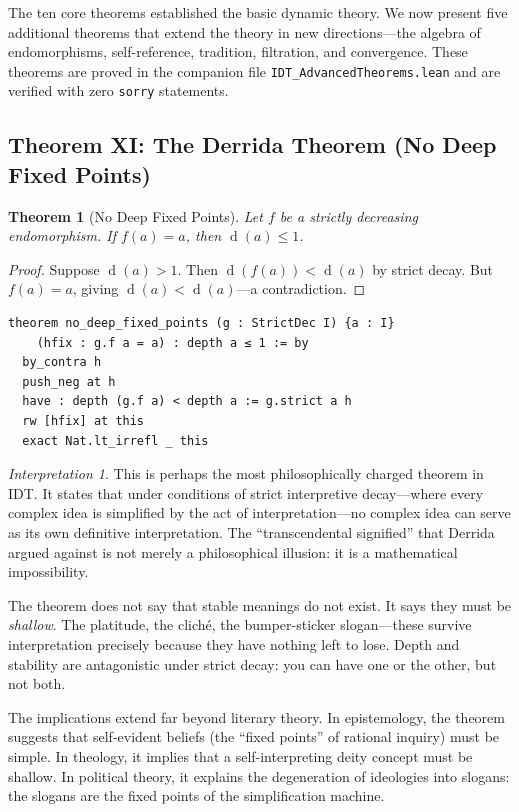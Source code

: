 \documentclass[11pt,openany]{book}
\theoremstyle{definition}
\theoremstyle{plain}
\newtheorem{theorem}[axiom]{Theorem}
\theoremstyle{remark}
\newtheorem{interpretation}[axiom]{Interpretation}
\newcommand{\depth}{\operatorname{d}}       %
\begin{document}
The ten core theorems established the basic dynamic theory. We now present five additional theorems that extend the theory in new directions---the algebra of endomorphisms, self-reference, tradition, filtration, and convergence. These theorems are proved in the companion file \texttt{IDT\_AdvancedTheorems.lean} and are verified with zero \texttt{sorry} statements.

\subsection{Theorem XI: The Derrida Theorem (No Deep Fixed Points)}

\begin{theorem}[No Deep Fixed Points]
\label{thm:key-derrida}
Let $f$ be a strictly decreasing endomorphism. If $f(a) = a$, then $\depth(a) \leq 1$.
\end{theorem}

\begin{proof}
Suppose $\depth(a) > 1$. Then $\depth(f(a)) < \depth(a)$ by strict decay. But $f(a) = a$, giving $\depth(a) < \depth(a)$---a contradiction.
\end{proof}

\begin{lstlisting}[language=Lean4]
theorem no_deep_fixed_points (g : StrictDec I) {a : I}
    (hfix : g.f a = a) : depth a ≤ 1 := by
  by_contra h
  push_neg at h
  have : depth (g.f a) < depth a := g.strict a h
  rw [hfix] at this
  exact Nat.lt_irrefl _ this
\end{lstlisting}

\begin{interpretation}
This is perhaps the most philosophically charged theorem in IDT. It states that under conditions of strict interpretive decay---where every complex idea is simplified by the act of interpretation---no complex idea can serve as its own definitive interpretation. The ``transcendental signified'' that Derrida argued against is not merely a philosophical illusion: it is a mathematical impossibility.

The theorem does not say that stable meanings do not exist. It says they must be \emph{shallow}. The platitude, the cliché, the bumper-sticker slogan---these survive interpretation precisely because they have nothing left to lose. Depth and stability are antagonistic under strict decay: you can have one or the other, but not both.

The implications extend far beyond literary theory. In epistemology, the theorem suggests that self-evident beliefs (the ``fixed points'' of rational inquiry) must be simple. In theology, it implies that a self-interpreting deity concept must be shallow. In political theory, it explains the degeneration of ideologies into slogans: the slogans are the fixed points of the simplification machine.
\end{interpretation}
\end{document}
